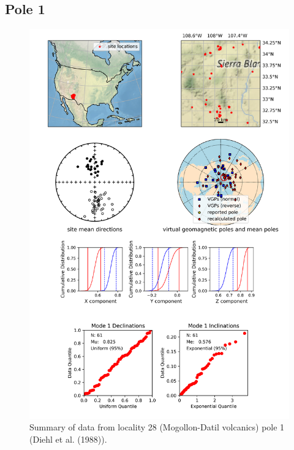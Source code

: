 \documentclass{article}
\begin{document}
\subsection{Pole 1}


\begin{figure}[H]
\centering
\includegraphics[width=5 in]{./28/1/pole_summary.png}
\caption{Summary of data from locality 28 (Mogollon-Datil volcanics) pole 1 (Diehl et al. (1988)).}
\end{figure}
\end{document}
